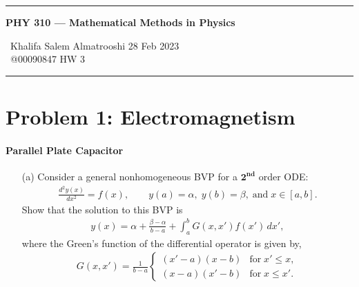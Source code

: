 \documentclass{article}
\begin{document}
	\begin{center}
		\hrule
		\vspace{0.4cm}
		{\textbf { \large PHY 310 --- Mathematical Methods in Physics}}
		\vspace{0.4cm}
	\end{center}
	{\ Khalifa Salem Almatrooshi \hspace{\fill}  28 Feb 2023 \\
		{ } \ @00090847 \hspace{\fill}  HW 3 \\
		\hrule	
	
	\section*{Problem 1: Electromagnetism}
	\paragraph{Parallel Plate Capacitor} 
	\begin{enumerate}
		\item[(a)] Consider a general nonhomogeneous BVP for a $\bm{2^{nd}}$ order ODE:
		\begin{equation*}
			\begin{split}
				\frac{d^2 y(x)}{dx^2} = f(x), \quad \quad y(a) = \alpha, \; y(b) = \beta, \; \text{and} \; x \in \left[a,b\right].
			\end{split}
		\end{equation*}
		Show that the solution to this BVP is
		\begin{equation*}
			\begin{split}
				y(x) = \alpha + \frac{\beta - \alpha}{b - a} + \int_{a}^{b} G(x,x') f(x') \, dx',
			\end{split}
		\end{equation*}
		where the Green's function of the differential operator is given by,
		\begin{equation*}
			\begin{split}
				G(x,x') = \frac{1}{b - a}
				\begin{cases}
					(x' - a)(x - b) & \text{for} \; x' \leq x, \\
					(x - a)(x' - b) & \text{for} \; x \leq x'.
				\end{cases}
			\end{split}
		\end{equation*}

\end{enumerate}}
\end{document}

